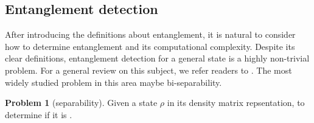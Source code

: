 \documentclass[
reprint,
aps,
pra,
floatfix,
]{revtex4-2}
\theoremstyle{plain}
\theoremstyle{definition}
\newtheorem{problem}{Problem}
\newtheorem{example}{Example}
\newtheorem{remark}{Remark}
\newcommand{\dm}{\rho}
\newcommand{\ghz}{\text{GHZ}}
\begin{document}






\subsection{Entanglement detection}
After introducing the definitions about entanglement, 
it is natural to consider how to determine entanglement and its computational complexity.
Despite its clear definitions, entanglement detection for a general state is a highly non-trivial problem.
For a general review on this subject, we refer readers to \cite{guhneEntanglementDetection2009}.
The most widely studied problem in this area maybe bi-separability.
\begin{problem}[separability]\label{prm:separability}
	Given a state $\dm$ in its density matrix repsentation, to determine if it is .
\end{problem}
\end{document}
